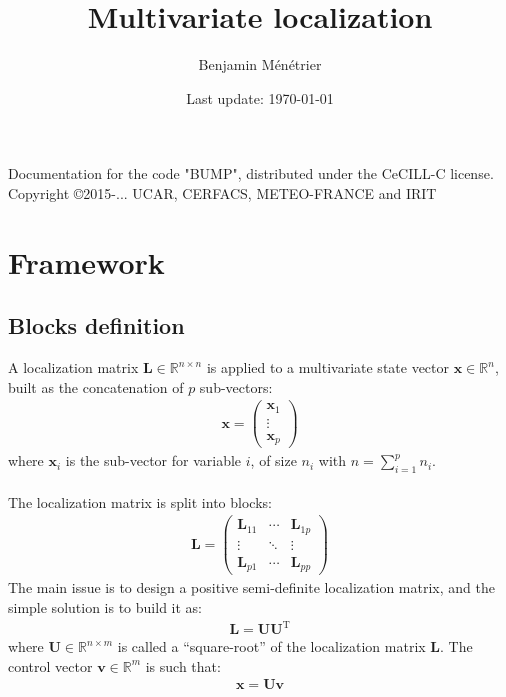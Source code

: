 \documentclass[12pt]{scrartcl}
\begin{document}
\title{Multivariate localization}
\author{Benjamin Ménétrier}
\date{Last update: \today}

\thispagestyle{empty}

\maketitle
\begin{center}
Documentation for the code "BUMP", distributed under the CeCILL-C license.\\
Copyright \copyright 2015-... UCAR, CERFACS, METEO-FRANCE and IRIT
\end{center}

\tableofcontents

\clearpage


\section{Framework}

\subsection{Blocks definition}
A localization matrix $\mathbf{L} \in \mathbb{R}^{n \times n}$ is applied to a multivariate state vector $\mathbf{x} \in \mathbb{R}^n$, built as the concatenation of $p$ sub-vectors:
\begin{align}
\mathbf{x} = \left( \begin{array}{c}
\mathbf{x}_1 \\[1ex]
\hline
\vdots \\
\hline
\mathbf{x}_p
\end{array} \right)
\end{align}
where $\mathbf{x}_i$ is the sub-vector for variable $i$, of size $n_i$ with $\displaystyle n = \sum_{i=1}^p n_i$.\\
$  $\\
The localization matrix is split into blocks:
\begin{align}
\mathbf{L} = \left( \begin{array}{ccc}
\mathbf{L}_{11} & \cdots & \mathbf{L}_{1p} \\
\vdots & \ddots & \vdots \\
\mathbf{L}_{p1} & \cdots & \mathbf{L}_{pp}
\end{array} \right)
\end{align}
The main issue is to design a positive semi-definite localization matrix, and the simple solution is to build it as:
\begin{align}
\mathbf{L} = \mathbf{UU}^\textrm{T}
\end{align}
where $\mathbf{U} \in \mathbb{R}^{n \times m}$ is called a ``square-root'' of the localization matrix $\mathbf{L}$. The control vector $\mathbf{v} \in \mathbb{R}^m$ is such that:
\begin{align}
\mathbf{x} = \mathbf{U} \mathbf{v}
\end{align}
\end{document}
